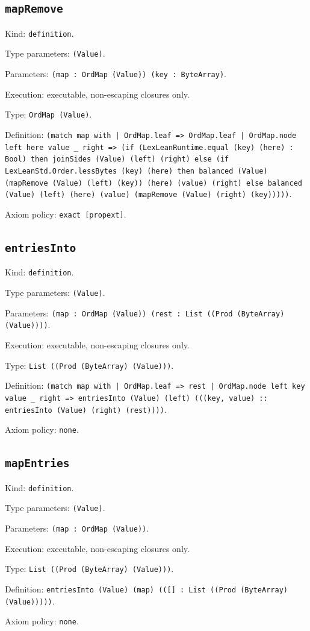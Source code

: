 \documentclass[11pt]{article}
\begin{document}
\subsection*{\texttt{mapRemove}}
\noindent Kind: \texttt{definition}.\par
\noindent Type parameters: \texttt{(Value)}.\par
\noindent Parameters: \texttt{(map : OrdMap (Value)) (key : ByteArray)}.\par
\noindent Execution: executable, non-escaping closures only.\par
\noindent Type: \texttt{OrdMap (Value)}.\par
\noindent Definition: \texttt{(match map with | OrdMap.leaf => OrdMap.leaf | OrdMap.node left here value \_ right => (if (LexLeanRuntime.equal (key) (here) : Bool) then joinSides (Value) (left) (right) else (if LexLeanStd.Order.lessBytes (key) (here) then balanced (Value) (mapRemove (Value) (left) (key)) (here) (value) (right) else balanced (Value) (left) (here) (value) (mapRemove (Value) (right) (key)))))}.\par
\noindent Axiom policy: \texttt{exact [propext]}.\par
\subsection*{\texttt{entriesInto}}
\noindent Kind: \texttt{definition}.\par
\noindent Type parameters: \texttt{(Value)}.\par
\noindent Parameters: \texttt{(map : OrdMap (Value)) (rest : List ((Prod (ByteArray) (Value))))}.\par
\noindent Execution: executable, non-escaping closures only.\par
\noindent Type: \texttt{List ((Prod (ByteArray) (Value)))}.\par
\noindent Definition: \texttt{(match map with | OrdMap.leaf => rest | OrdMap.node left key value \_ right => entriesInto (Value) (left) (((key, value) :: entriesInto (Value) (right) (rest))))}.\par
\noindent Axiom policy: \texttt{none}.\par
\subsection*{\texttt{mapEntries}}
\noindent Kind: \texttt{definition}.\par
\noindent Type parameters: \texttt{(Value)}.\par
\noindent Parameters: \texttt{(map : OrdMap (Value))}.\par
\noindent Execution: executable, non-escaping closures only.\par
\noindent Type: \texttt{List ((Prod (ByteArray) (Value)))}.\par
\noindent Definition: \texttt{entriesInto (Value) (map) (([] : List ((Prod (ByteArray) (Value)))))}.\par
\noindent Axiom policy: \texttt{none}.\par
\end{document}
